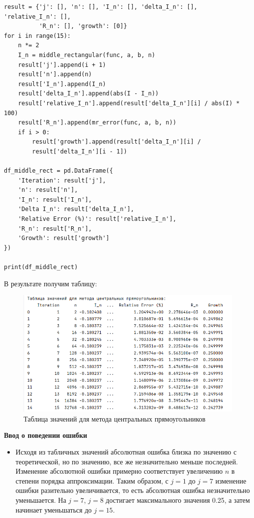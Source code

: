 \documentclass{article}
\begin{document}
\begin{lstlisting}
result = {'j': [], 'n': [], 'I_n': [], 'delta_I_n': [], 'relative_I_n': [],
          'R_n': [], 'growth': [0]}
for i in range(15):
    n *= 2
    I_n = middle_rectangular(func, a, b, n)
    result['j'].append(i + 1)
    result['n'].append(n)
    result['I_n'].append(I_n)
    result['delta_I_n'].append(abs(I - I_n))
    result['relative_I_n'].append(result['delta_I_n'][i] / abs(I) * 100)
    result['R_n'].append(mr_error(func, a, b, n))
    if i > 0:
        result['growth'].append(result['delta_I_n'][i] /
        result['delta_I_n'][i - 1])

df_middle_rect = pd.DataFrame({
    'Iteration': result['j'],
    'n': result['n'],
    'I_n': result['I_n'],
    'Delta I_n': result['delta_I_n'],
    'Relative Error (%)': result['relative_I_n'],
    'R_n': result['R_n'],
    'Growth': result['growth']
})

print(df_middle_rect)
\end{lstlisting}

В результате получим таблицу:
\begin{figure}[h]
    \centering
    \includegraphics[width=1\textwidth]{lab_4_1.png}
    \caption{ Таблица значений для метода центральных прямоугольников}
    \label{fig:my_label}
\end{figure}


\textbf{\large{Ввод о поведении ошибки}} \\

\begin{itemize}
    \item Исходя из табличных значений абсолютная ошибка близка по значению с теоретической, но по значению, все же незначительно меньше последней. Изменение абсолютной ошибки примерно соответствует увеличению $n$ в степени порядка аппроксимации. Таким образом, с $j=1$ до $j=7$ изменение ошибки разительно увеличивается, то есть абсолютная ошибка незначительно уменьшается. На $j=7$, $j=8$ достигает максимального значения 0.25, а затем начинает уменьшаться до $j=15$.
\end{itemize}
\end{document}
